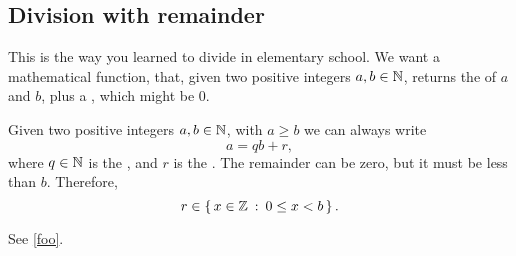 \subsection{Division with remainder}

This is the way you learned to divide in elementary school. We want a
mathematical function, that, given two positive integers $a, b \in
\mathbb{N}$, returns the  of $a$ and $b$, plus a
, which might be $0$.

\begin{lemma}
  Given two positive integers $a, b \in \mathbb{N}$, with $a \ge b$ we can
  always write $$a = qb + r,$$ where $q \in \mathbb{N}$ is the
  , and $r$ is the . The remainder can
  be zero, but it must be less than $b$. Therefore,
  $$r \in \left\{\, x \in \mathbb{Z} \::\: 0 \le x < b \,\right\}.$$
\end{lemma}


See \cref{foo}.